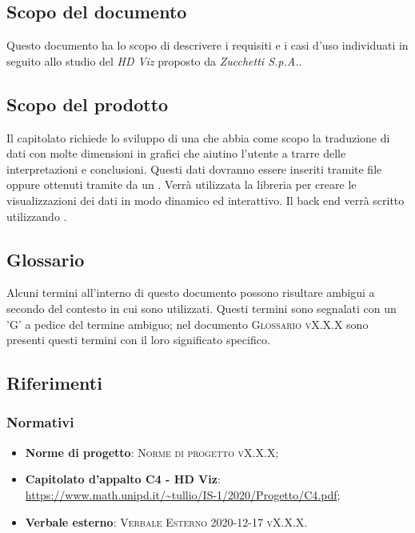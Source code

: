 \documentclass[../analisi-dei-requisiti.tex]{subfiles}
\begin{document}
\subsection{Scopo del documento}%
\label{subs:scopo_del_documento}
Questo documento ha lo scopo di descrivere i requisiti e i casi d'uso individuati in seguito allo studio del  \emph{HD Viz} proposto da \emph{Zucchetti S.p.A.}. 

\subsection{Scopo del prodotto}%
\label{subs:scopo_del_prodotto}
Il capitolato richiede lo sviluppo di una  che abbia come scopo la 
traduzione di dati con molte dimensioni in grafici che aiutino l’utente a trarre delle interpretazioni e conclusioni. Questi dati dovranno essere inseriti tramite file  oppure ottenuti tramite  da un .
Verrà utilizzata la libreria   per creare le visualizzazioni dei dati in modo dinamico ed interattivo.
Il back end verrà scritto utilizzando . 


\subsection{Glossario}
\label{subs:glossario}
Alcuni termini all'interno di questo documento possono risultare ambigui a secondo del contesto in cui sono utilizzati.
Questi termini sono segnalati con un 'G' a pedice del termine ambiguo; nel documento \textsc{Glossario vX.X.X} sono presenti questi termini con il loro significato specifico.


\subsection{Riferimenti}
\label{subs:riferimenti}

\subsubsection{Normativi}%
\label{sssec:normativi}

\begin{itemize}
  \item \textbf{Norme di progetto}: \textsc{Norme di progetto vX.X.X};
  \item \textbf{Capitolato d'appalto C4 - HD Viz}: \url{https://www.math.unipd.it/~tullio/IS-1/2020/Progetto/C4.pdf};
  \item \textbf{Verbale esterno}: \textsc{Verbale Esterno 2020-12-17 vX.X.X}.
\end{itemize}
\end{document}
